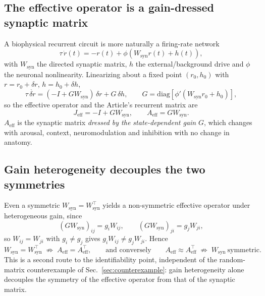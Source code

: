 \documentclass[11pt]{article}
\begin{document}
\subsection{The effective operator is a gain-dressed synaptic matrix}
A biophysical recurrent circuit is more naturally a firing-rate network
\begin{equation}
\tau\,\dot r(t)=-r(t)+\phi\!\left(W_{\mathrm{syn}}r(t)+h(t)\right),
\end{equation}
with $W_{\mathrm{syn}}$ the directed synaptic matrix, $h$ the external/background
drive and $\phi$ the neuronal nonlinearity. Linearizing about a fixed point
$(r_0,h_0)$ with $r=r_0+\delta r$, $h=h_0+\delta h$,
\begin{equation}
\tau\,\dot{\delta r}=(-I+GW_{\mathrm{syn}})\,\delta r+G\,\delta h,
\qquad G=\mathrm{diag}\!\left[\phi'(W_{\mathrm{syn}}r_0+h_0)\right],
\end{equation}
so the effective operator and the Article's recurrent matrix are
\begin{equation}
J_{\mathrm{eff}}=-I+GW_{\mathrm{syn}},\qquad A_{\mathrm{eff}}=GW_{\mathrm{syn}}.
\label{eq:Aeff}
\end{equation}
$A_{\mathrm{eff}}$ is the synaptic matrix \emph{dressed by the state-dependent
gain} $G$, which changes with arousal, context, neuromodulation and inhibition
with no change in anatomy.

\subsection{Gain heterogeneity decouples the two symmetries}
Even a symmetric $W_{\mathrm{syn}}=W_{\mathrm{syn}}^\top$ yields a non-symmetric
effective operator under heterogeneous gain, since
\begin{equation}
(GW_{\mathrm{syn}})_{ij}=g_i W_{ij},\qquad (GW_{\mathrm{syn}})_{ji}=g_j W_{ji},
\end{equation}
so $W_{ij}=W_{ji}$ with $g_i\neq g_j$ gives $g_iW_{ij}\neq g_jW_{ji}$. Hence
\begin{equation}
W_{\mathrm{syn}}=W_{\mathrm{syn}}^\top \;\not\Rightarrow\;
A_{\mathrm{eff}}=A_{\mathrm{eff}}^\top,
\qquad\text{and conversely}\qquad
A_{\mathrm{eff}}\approx A_{\mathrm{eff}}^\top \;\not\Rightarrow\;
W_{\mathrm{syn}}\ \text{symmetric}.
\end{equation}
This is a second route to the identifiability point, independent of the
random-matrix counterexample of Sec.~\ref{sec:counterexample}: gain
heterogeneity alone decouples the symmetry of the effective operator from that
of the synaptic matrix.
\end{document}
